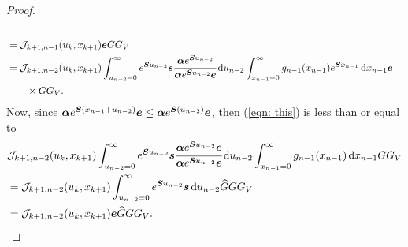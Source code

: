 \begin{proof}
\begin{align}
		\\& = \mathcal J_{k+1,n-1}(u_k,x_{k+1})  \boldsymbol e G  G_V\label{eqn: mid ref} 
		\\& = \mathcal J_{k+1,n-2}(u_k,x_{k+1}) \int_{u_{n-2}=0}^\infty e^{\boldsymbol{S}u_{n-2}}\boldsymbol s \cfrac{\boldsymbol \alpha e^{\boldsymbol{S}u_{n-2}}}{\boldsymbol \alpha e^{\boldsymbol{S}u_{n-2}}\boldsymbol e}\, \mathrm{d} u_{n-2}  \int_{x_{n-1}=0}^\infty g_{n-1}(x_{n-1}) e^{\boldsymbol{S}x_{n-1}} \, \mathrm{d} x_{n-1} \boldsymbol e \nonumber 
		\\&\qquad {} \times G  G_V.\label{eqn: this}
	\end{align}
	Now, since \(\boldsymbol\alpha e^{\boldsymbol{S}(x_{n-1}+u_{n-2})}\boldsymbol e\leq  \boldsymbol\alpha e^{\boldsymbol{S}(u_{n-2})}\boldsymbol e\), then (\ref{eqn: this}) is less than or equal to
	\begin{align}
		&\mathcal J_{k+1,n-2}(u_k,x_{k+1}) \int_{u_{n-2}=0}^\infty e^{\bs{S}u_{n-2}}\bs s \cfrac{\bs \alpha e^{\bs{S}u_{n-2}}\bs e}{\bs \alpha e^{\bs{S}u_{n-2}}\bs e}\wrt u_{n-2}  \int_{x_{n-1}=0}^\infty g_{n-1}(x_{n-1})\wrt x_{n-1} G  G_V\nonumber
		\\& = \mathcal J_{k+1,n-2}(u_k,x_{k+1}) \int_{u_{n-2}=0}^\infty e^{\bs{S}u_{n-2}}\bs s \wrt u_{n-2} \widehat G G G_V \nonumber
		\\& = \mathcal J_{k+1,n-2}(u_k,x_{k+1}) \bs e \widehat G G G_V. \label{eqn: ref here too}

\end{align}
\end{proof}
